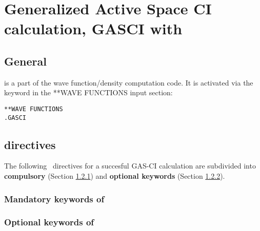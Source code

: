 \chapter{Generalized Active Space CI calculation, GASCI with {\lucita}}\label{ch:lucita}

\section{General}\label{sec:lucita-general}

    {\lucita} is a part of the wave function/density computation code. 
It is activated via the keyword {} in the **WAVE FUNCTIONS 
input section:\\[2ex]
\begin{inputex} \begin{verbatim}
**WAVE FUNCTIONS
.GASCI
\end{verbatim} \end{inputex}
 
\section{ directives}\label{sec:lucita-inp}

          The following \ directives for a succesful GAS-CI calculation 
are subdivided into {\bf{compulsory}} (Section \ref{sec:lucita-inp-mand}) 
and {\bf{optional keywords}} (Section \ref{sec:lucita-inp-opt}). 

\subsection{Mandatory keywords of }\label{sec:lucita-inp-mand}

\subsection{Optional keywords of }\label{sec:lucita-inp-opt}

